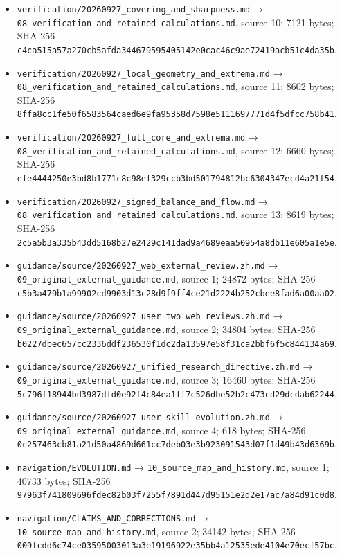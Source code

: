 \documentclass[
  10pt,
]{article}
\begin{document}
\begin{itemize}
  \nolinkurl{verification/20260927_conformal_and_endpoint.md} →
  \nolinkurl{08_verification_and_retained_calculations.md}, source 9;
  7304 bytes; SHA-256
  \nolinkurl{ff105d8c73aa129938dfdf21b46a4e5d84c9db3dd8a278d2fb0ee4da54b4e1ca}.
\item
  \nolinkurl{verification/20260927_covering_and_sharpness.md} →
  \nolinkurl{08_verification_and_retained_calculations.md}, source 10;
  7121 bytes; SHA-256
  \nolinkurl{c4ca515a57a270cb5afda344679595405142e0cac46c9ae72419acb51c4da35b}.
\item
  \nolinkurl{verification/20260927_local_geometry_and_extrema.md} →
  \nolinkurl{08_verification_and_retained_calculations.md}, source 11;
  8602 bytes; SHA-256
  \nolinkurl{8ffa8cc1fe50f6583564caed6e9fa95358d7598e5111697771d4f5dfcc758b41}.
\item
  \nolinkurl{verification/20260927_full_core_and_extrema.md} →
  \nolinkurl{08_verification_and_retained_calculations.md}, source 12;
  6660 bytes; SHA-256
  \nolinkurl{efe4444250e3bd8b1771c8c98ef329ccb3bd501794812bc6304347ecd4a21f54}.
\item
  \nolinkurl{verification/20260927_signed_balance_and_flow.md} →
  \nolinkurl{08_verification_and_retained_calculations.md}, source 13;
  8619 bytes; SHA-256
  \nolinkurl{2c5a5b3a335b43dd5168b27e2429c141dad9a4689eaa50954a8db11e605a1e5e}.
\item
  \nolinkurl{guidance/source/20260927_web_external_review.zh.md} →
  \nolinkurl{09_original_external_guidance.md}, source 1; 24872 bytes;
  SHA-256
  \nolinkurl{c5b3a479b1a99902cd9903d13c28d9f9ff4ce21d2224b252cbee8fad6a00aa02}.
\item
  \nolinkurl{guidance/source/20260927_user_two_web_reviews.zh.md} →
  \nolinkurl{09_original_external_guidance.md}, source 2; 34804 bytes;
  SHA-256
  \nolinkurl{b0227dbec657cc2336ddf236530f1dc2da13597e58f31ca2bbf6f5c844134a69}.
\item
  \nolinkurl{guidance/source/20260927_unified_research_directive.zh.md}
  → \nolinkurl{09_original_external_guidance.md}, source 3; 16460 bytes;
  SHA-256
  \nolinkurl{5c796f18944bd3987dfd0e92f4c84ea1ff7c526dbe52b2c473cd29dcdab62244}.
\item
  \nolinkurl{guidance/source/20260927_user_skill_evolution.zh.md} →
  \nolinkurl{09_original_external_guidance.md}, source 4; 618 bytes;
  SHA-256
  \nolinkurl{0c257463cb81a21d50a4869d661cc7deb03e3b923091543d07f1d49b43d6369b}.
\item
  \nolinkurl{navigation/EVOLUTION.md} →
  \nolinkurl{10_source_map_and_history.md}, source 1; 40733 bytes;
  SHA-256
  \nolinkurl{97963f741809696fdec82b03f7255f7891d447d95151e2d2e17ac7a84d91c0d8}.
\item
  \nolinkurl{navigation/CLAIMS_AND_CORRECTIONS.md} →
  \nolinkurl{10_source_map_and_history.md}, source 2; 34142 bytes;
  SHA-256
  \nolinkurl{009fcdd6c74ce03595003013a3e19196922e35bb4a12535ede4104e70ecf57bc}.
\end{itemize}
\end{document}
